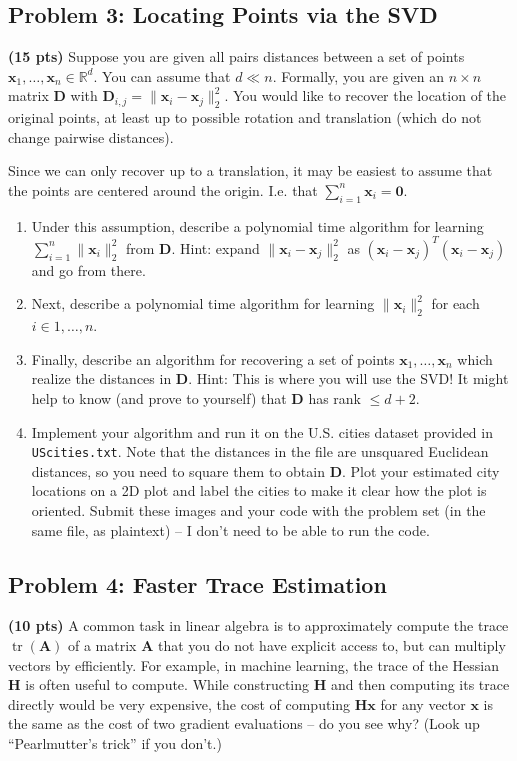 \documentclass[10pt]{article}
\newcommand{\bv}[1]{\mathbf{#1}}
\newcommand{\R}{\mathbb{R}}
\DeclareMathOperator{\tr}{tr}
\begin{document}
\subsection{Problem 3: Locating Points via the SVD}
	
	\textbf{(15 pts)} Suppose you are given all pairs distances between a set of points $\bv{x}_1, \ldots, \bv{x}_n \in \R^d$. You can assume that $d \ll n$. Formally, you are given an $n\times n$ matrix $\bv{D}$ with $\bv{D}_{i,j} = \|\bv{x}_i - \bv{x}_j\|_2^2$. You would like to recover the location of the original points, at least up to possible rotation and translation (which do not change pairwise distances). 
	
	Since we can only recover up to a translation, it may be easiest to assume that the points are centered around the origin. I.e. that $\sum_{i=1}^n \bv{x}_i = \bv{0}$. 
	\begin{enumerate}
		\item Under this assumption, describe a polynomial time algorithm for learning $\sum_{i=1}^n \|\bv{x}_i\|_2^2$ from $\bv{D}$. Hint: expand $\|\bv{x}_i - \bv{x}_j\|_2^2$ as $(\bv{x}_i - \bv{x}_j)^T(\bv{x}_i - \bv{x}_j)$ and go from there.
		\item Next, describe a polynomial time algorithm for learning $\|\bv{x}_i\|_2^2$ for each $i \in 1, \ldots, n$. 
		\item Finally, describe an algorithm for recovering a set of points $\bv{x}_1,\ldots, \bv{x}_n$ which realize the distances in $\bv{D}$. Hint: This is where you will use the SVD! It might help to know (and prove to yourself) that $\bv{D}$ has rank $\leq d + 2$.
		\item
		Implement your algorithm and run it on the U.S. cities dataset provided in \texttt{UScities.txt}. Note that the distances in the file are unsquared Euclidean distances, so you need to square them to obtain $\bv{D}$. Plot your  estimated city locations on a 2D plot and label the cities to make it clear how the plot is oriented. Submit these images and your code with the problem set (in the same file, as plaintext) -- I don't need to be able to run the code.
	\end{enumerate}


\subsection{Problem 4: Faster Trace Estimation}
\textbf{(10 pts)} A common task in linear algebra is to approximately compute the trace $\tr(\bv{A})$ of a matrix $\bv{A}$ that you do not have explicit access to, but can multiply vectors by efficiently. For example, in machine learning, the trace of the Hessian $\bv{H}$ is often useful to compute. While constructing $\bv{H}$ and then computing its trace directly would be very expensive, the cost of computing $\bv{H}\bv{x}$ for any vector $\bv{x}$ is the same as the cost of two gradient evaluations -- do you see why? (Look up ``Pearlmutter's trick'' if you don't.)
\end{document}

